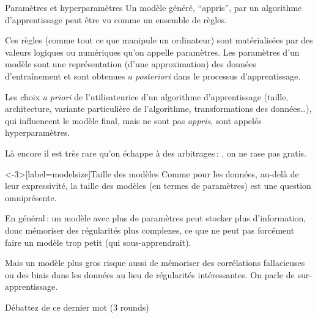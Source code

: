 \documentclass[
	xcolor={svgnames},
	aspectratio=169,
	french,
]{beamer}
\begin{document}
\begin{frame}{Paramètres et hyperparamètres}
	Un modèle généré, \enquote{appris}, par un algorithme d'apprentissage peut être vu comme un ensemble de règles.

	Ces règles (comme tout ce que manipule un ordinateur) sont matérialisées par des valeurs \alert{logiques} ou \alert{numériques} qu'on appelle \alert{paramètres}. Les paramètres d'un modèle sont une représentation (d'une approximation) des données d'entraînement et sont obtenues \emph{a posteriori} dans le processus d'apprentissage.

	\pause

	Les choix \emph{a priori} de l'utilisateurice d'un algorithme d'apprentissage (taille, architecture, variante particulière de l'algorithme, transformations des données…), qui influencent le modèle final, mais ne sont pas \emph{appris}, sont appelés \alert{hyperparamètres}.

	\pause

	Là encore il est très rare qu'on échappe à des arbitrages : , on ne rase pas gratis.
\end{frame}

\begin{frame}<-3>[label=modelsize]{Taille des modèles}
	Comme pour les données, au-delà de leur expressivité, la \alert{taille} des modèles (en termes de paramètres) est une question omniprésente.

	\pause

	En général : un modèle avec plus de paramètres peut stocker plus d'information, donc \alert{mémoriser} des régularités plus complexes, ce que ne peut pas forcément faire un modèle trop petit (qui \alert{sous-apprendrait}).

	\pause

	Mais un modèle plus gros risque aussi de mémoriser des corrélations fallacieuses ou des biais dans les données au lieu de régularités \alert{intéressantes}. \pause On parle de \alert{sur-apprentissage}.

	\pause

	Débattez de ce dernier mot (3 rounds)
\end{frame}
\end{document}
